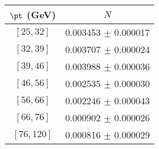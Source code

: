 \begin{tabular}{c||c}
$\pt$ (GeV) & $N$  \\
\hline
$[25, 32]$ & 0.003453 $\pm$ 0.000017\\
$[32, 39]$ & 0.003707 $\pm$ 0.000024\\
$[39, 46]$ & 0.003988 $\pm$ 0.000036\\
$[46, 56]$ & 0.002535 $\pm$ 0.000030\\
$[56, 66]$ & 0.002246 $\pm$ 0.000043\\
$[66, 76]$ & 0.000902 $\pm$ 0.000026\\
$[76, 120]$ & 0.000816 $\pm$ 0.000029\\
\end{tabular}
